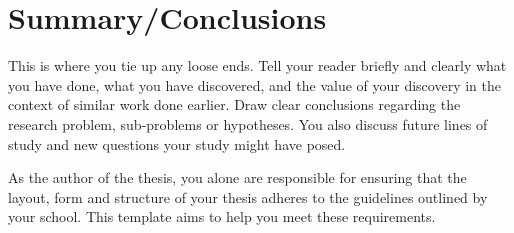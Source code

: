 \documentclass[english, 12pt, a4paper, sci, utf8, a-2b, online]{../definitions/aaltothesis}
\begin{document}
\clearpage

\section{Summary/Conclusions}
\label{sec:summary}

This is where you tie up any loose ends. Tell your reader briefly and clearly 
what you have done, what you have discovered, and the value of your discovery 
in the context of similar work done earlier. Draw clear conclusions regarding 
the research problem, sub-problems or hypotheses. You also discuss future lines 
of study and new questions your study might have posed.

As the author of the thesis, you alone are responsible for ensuring that the 
layout, form and structure of your thesis adheres to the guidelines outlined by 
your school. This template aims to help you meet these requirements.



\clearpage


\printbibliography[heading=bibintoc] %



%
%
%
%
%
\end{document}
